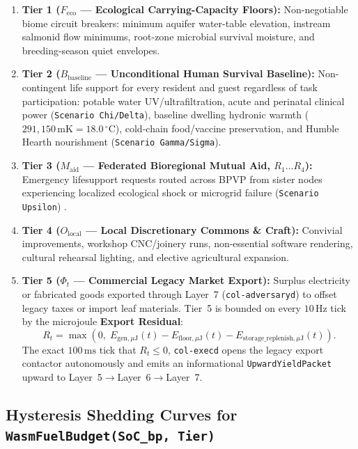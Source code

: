 \begin{enumerate}
\item \textbf{Tier 1 ($F_{\mathrm{eco}}$ --- Ecological Carrying-Capacity Floors):}
        Non-negotiable biome circuit breakers: minimum aquifer water-table elevation,
        instream salmonid flow minimums, root-zone microbial survival moisture, and
        breeding-season quiet envelopes.
\item \textbf{Tier 2 ($B_{\mathrm{baseline}}$ --- Unconditional Human Survival Baseline):}
        Non-contingent life support for every resident and guest regardless of task
        participation: potable water UV/ultrafiltration, acute and perinatal clinical power
        (\texttt{Scenario Chi/Delta}), baseline dwelling hydronic warmth
        ($291{,}150\,\mathrm{mK} = 18.0\,^\circ\mathrm{C}$), cold-chain food/vaccine
        preservation, and Humble Hearth nourishment (\texttt{Scenario Gamma/Sigma}).
\item \textbf{Tier 3 ($M_{\mathrm{aid}}$ --- Federated Bioregional Mutual Aid, $R_1 \dots R_4$):}
        Emergency lifesupport requests routed across BPVP from sister nodes experiencing
        localized ecological shock or microgrid failure (\texttt{Scenario Upsilon})
        \parencite{kropotkin1902}.
    \item \textbf{Tier 4 ($O_{\mathrm{local}}$ --- Local Discretionary Commons \& Craft):} Convivial improvements, workshop CNC/joinery runs, non-essential software rendering, cultural rehearsal lighting, and elective agricultural expansion.
\item \textbf{Tier 5 ($\Phi_t$ --- Commercial Legacy Market Export):} Surplus electricity or
        fabricated goods exported through Layer~7 (\texttt{col-adversaryd}) to offset legacy
        taxes or import leaf materials. Tier~5 is bounded on every $10\,\mathrm{Hz}$ tick by
        the microjoule \textbf{Export Residual}:
    \begin{equation}
    R_t = \max\!\left(0, \; E_{\mathrm{gen},\mu\mathrm{J}}(t) - E_{\mathrm{floor},\mu\mathrm{J}}(t) - E_{\mathrm{storage\_replenish},\mu\mathrm{J}}(t)\right).
    \label{eq:ch3-export-residual}
    \end{equation}
The exact $100\,\mathrm{ms}$ tick that $R_t \le 0$, \texttt{col-execd} opens the legacy
    export contactor autonomously and emits an informational \texttt{UpwardYieldPacket}
    upward to Layer~5$\to$Layer~6$\to$Layer~7.
\end{enumerate}

\subsection{Hysteresis Shedding Curves for \texttt{WasmFuelBudget(SoC\_bp, Tier)}}


